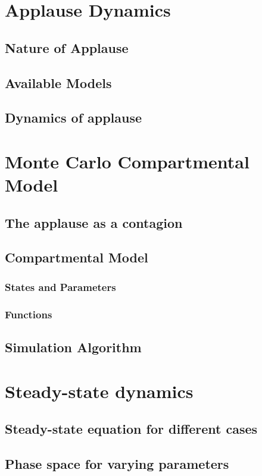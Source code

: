\documentclass{article}
\begin{document}
\tableofcontents
\newpage
\section{Applause Dynamics}
 \subsection{Nature of Applause}
 \subsection{Available Models}
 \subsection{Dynamics of applause}
 
\section{Monte Carlo Compartmental Model}
 \subsection{The applause as a contagion}
 \subsection{Compartmental Model}
  \subsubsection{States and Parameters}
  \subsubsection{Functions}
 \subsection{Simulation Algorithm}
 
\section{Steady-state dynamics}
 \subsection{Steady-state equation for different cases}
 \subsection{Phase space for varying parameters}
\end{document}

